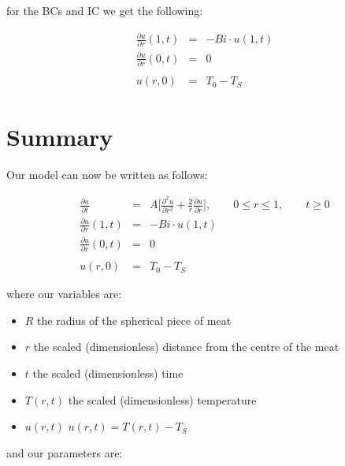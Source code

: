 \documentclass{report}
\begin{document}
for the BCs and IC we get the following:\bigskip

\begin{eqnarray*} 
\frac{\partial u}{\partial r}(1, t) & = & -Bi \cdot u(1, t) \\
\frac{\partial u}{\partial r}(0, t) & = & 0 \\\\
                            u(r, 0) & = & T_0 - T_S
\end{eqnarray*}\medskip


\section{Summary}

Our model can now be written as follows:\bigskip

\begin{eqnarray*} 
      \frac{\partial u}{\partial t} & = & A \Bigg[  \frac{\partial^2 u}{\partial r^2} + \frac{2}{r} \frac{\partial u}{\partial r} \Bigg], \qquad 0 \leq r \leq 1, \qquad t \geq 0 \\
\frac{\partial u}{\partial r}(1, t) & = & -Bi \cdot u(1, t) \\
\frac{\partial u}{\partial r}(0, t) & = & 0 \\\\
                            u(r, 0) & = & T_0 - T_S
\end{eqnarray*}\medskip

where our variables are:\bigskip

\begin{itemize}

\item $R$       \tab the radius of the spherical piece of meat

\item $r$       \tab the scaled (dimensionless) distance from the centre of the meat

\item $t$       \tab the scaled (dimensionless) time

\item $T(r, t)$ \tab the scaled (dimensionless) temperature

\item $u(r, t)$ \tab $u(r, t) = T(r, t) - T_S$

\end{itemize}\medskip

and our parameters are:\bigskip
\end{document}
